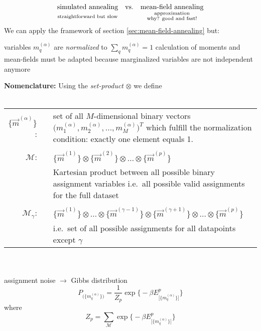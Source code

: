 \[ \begin{array}{ccc}
  \text{simulated annealing}
  & \text{vs.}
  & \text{mean-field annealing} \\
  \text{\scriptsize straightforward but slow}
  && \substack{ 	\text{approximation} \\
    \text{why? good and fast!}}
\end{array} 
\]
We can apply the framework of section \ref{sec:mean-field-annealing}
but:
\begin{itemize}
	\itl variables $m_q^{(\alpha)}$ are \emph{normalized} to $\sum\limits_q
		m_q^{(\alpha)} = 1$ 
	\itl calculation of moments and mean-fields must be adapted because marginalized variables are not independent anymore
\end{itemize}
\textbf{Nomenclature:} Using the \emph{set-product} $\otimes$ we define\\\\
\begin{tabular}{r l p{9cm}}
$\big\{ \vec{m}^{(\alpha)} \big\}$: & & set of all $M$-dimensional binary vectors $\big( m_1^{(\alpha)}, m_2^{(\alpha)}, \ldots, 
  m_M^{(\alpha)} \big)^T$ which fulfill the normalization condition: exactly one element equals 1. \\\\
$\mathscr{M}$: & & $\big\{ \vec{m}^{(1)} \big\} \otimes \big\{ \vec{m}^{(2)} \big\} \otimes \ldots \otimes \big\{ \vec{m}^{(p)} \big\}$\\
& & Kartesian product between all possible binary assignment variables i.e.\ all possible valid assignments for the full dataset\\\\
$\mathscr{M}_{\gamma}$:& &  $\big\{ \vec{m}^{(1)} \big\} \otimes \ldots \otimes \big\{ \vec{m}^{(\gamma - 1)} \big\} \otimes
  \big\{ \vec{m}^{(\gamma + 1)} \big\} \otimes \ldots \otimes
  \big\{ \vec{m}^{(p)} \big\}$\\
& & i.e.\ set of all possible assignments for all datapoints except $\gamma$
\end{tabular}
\\\\
assignment noise $\rightarrow$ Gibbs distribution
\begin{equation}
	P_{ \big( \big\{ m_q^{(\alpha)} \big\} \big) }
	= \frac{1}{Z_p} \exp \Big\{ -\beta 
		E_{\big[ \big\{ m_q^{(\alpha)} \big\} \big]}^p
		\Big\}
\end{equation}
where
\begin{equation}
	Z_p = \sum\limits_{\mathscr{M}} \exp \Big\{ -\beta
		E_{\big[ \big\{ m_q^{(\alpha)} \big\} \big]}^p
		\Big\}
\end{equation}
